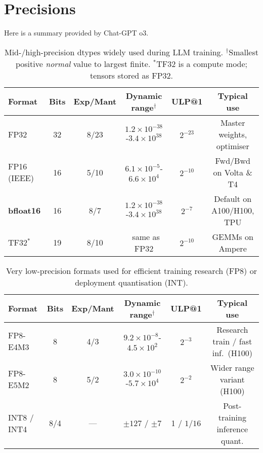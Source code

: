 \documentclass[11pt]{article}  %
\begin{document}
\section{Precisions}
Here is a summary provided by Chat-GPT o3.
\begin{table}[ht]
\centering
\renewcommand{\arraystretch}{1.15}
\begin{tabular}{@{}lccccc@{}}
\toprule
\textbf{Format} & \textbf{Bits} & \textbf{Exp/Mant} &
\textbf{Dynamic range$^\dagger$} & \textbf{ULP@1} &
\textbf{Typical use} \\
\midrule
FP32        & 32 & 8/23 & $1.2\!\times\!10^{-38}$-$3.4\!\times\!10^{38}$ & $2^{-23}$ & Master weights, optimiser \\
FP16 (IEEE) & 16 & 5/10 & $6.1\!\times\!10^{-5}$-$6.6\!\times\!10^{4}$   & $2^{-10}$ & Fwd/Bwd on Volta \& T4 \\
\textbf{bfloat16} & 16 & 8/7  & $1.2\!\times\!10^{-38}$-$3.4\!\times\!10^{38}$ & $2^{-7}$  & Default on A100/H100, TPU \\
TF32$^{*}$  & 19 & 8/10 & $\phantom{0}$same as FP32 & $2^{-10}$ & GEMMs on Ampere \\
\bottomrule
\end{tabular}
\caption{Mid-/high-precision dtypes widely used during LLM training.%
$^\dagger$Smallest positive \emph{normal} value to largest finite.%
$^{*}$TF32 is a compute mode; tensors stored as FP32.}
\end{table}

\begin{table}[ht]
\centering
\renewcommand{\arraystretch}{1.15}
\begin{tabular}{@{}lccccc@{}}
\toprule
\textbf{Format} & \textbf{Bits} & \textbf{Exp/Mant} &
\textbf{Dynamic range$^\dagger$} & \textbf{ULP@1} &
\textbf{Typical use} \\
\midrule
FP8-E4M3 & 8 & 4/3 & $9.2\!\times\!10^{-8}$-$4.5\!\times\!10^{2}$  & $2^{-3}$ & Research train / fast inf.\ (H100) \\
FP8-E5M2 & 8 & 5/2 & $3.0\!\times\!10^{-10}$-$5.7\!\times\!10^{4}$ & $2^{-2}$ & Wider range variant (H100) \\
INT8 / INT4 & 8/4 & — & $\pm127$ / $\pm7$ & 1 / $1/16$ & Post-training inference quant. \\
\bottomrule
\end{tabular}
\caption{Very low-precision formats used for efficient training research (FP8) or deployment quantisation (INT).}
\end{table}
\end{document}
